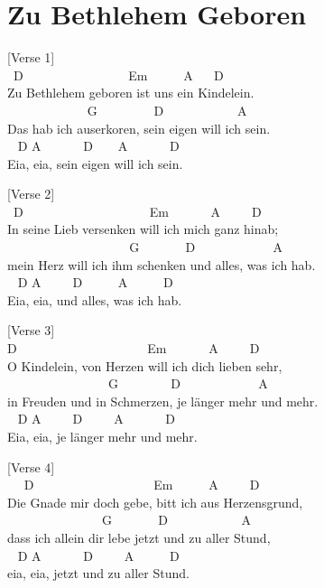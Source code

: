 \documentclass[
  letterpaper,
]{scrbook}
\begin{document}
\hypertarget{zu-bethlehem-geboren}{%
\chapter{Zu Bethlehem Geboren}\label{zu-bethlehem-geboren}}

{[}Verse 1{]}\\
\hspace*{0.333em} ~D ~ ~ ~ ~ ~ ~ ~ ~ ~ ~Em ~ ~ ~ A ~ ~D\\
Zu Bethlehem geboren ist uns ein Kindelein.\\
\hspace*{0.333em} ~ ~ ~ ~ ~ ~ ~ ~G ~ ~ ~ ~ ~ D ~ ~ ~ ~ ~ ~ ~A\\
Das hab ich auserkoren, sein eigen will ich sein.\\
\hspace*{0.333em} ~ D A ~ ~ ~ ~D ~ ~ A ~ ~ ~ ~D\\
Eia, eia, sein eigen will ich sein.

{[}Verse 2{]}\\
\hspace*{0.333em} ~D ~ ~ ~ ~ ~ ~ ~ ~ ~ ~ ~ ~Em ~ ~ ~ ~A ~ ~ ~D\\
In seine Lieb versenken will ich mich ganz hinab;\\
\hspace*{0.333em} ~ ~ ~ ~ ~ ~ ~ ~ ~ ~ ~ ~G ~ ~ ~ ~ D ~ ~ ~ ~ ~ ~ ~ A\\
mein Herz will ich ihm schenken und alles, was ich hab.\\
\hspace*{0.333em} ~ D A ~ ~ ~D ~ ~ ~ A ~ ~ ~ D\\
Eia, eia, und alles, was ich hab.

{[}Verse 3{]}\\
\hspace*{0.333em} D ~ ~ ~ ~ ~ ~ ~ ~ ~ ~ ~ ~ Em ~ ~ ~ ~A ~ ~ ~D\\
O Kindelein, von Herzen will ich dich lieben sehr,\\
\hspace*{0.333em} ~ ~ ~ ~ ~ ~ ~ ~ ~ ~G ~ ~ ~ ~ ~D ~ ~ ~ ~ ~ ~ ~ A\\
in Freuden und in Schmerzen, je länger mehr und mehr.\\
\hspace*{0.333em} ~ D A ~ ~ ~D ~ ~ ~A ~ ~ ~ ~D\\
Eia, eia, je länger mehr und mehr.

{[}Verse 4{]}\\
\hspace*{0.333em} ~ ~D ~ ~ ~ ~ ~ ~ ~ ~ ~ ~ ~ Em ~ ~ ~ A ~ ~ ~D\\
Die Gnade mir doch gebe, bitt ich aus Herzensgrund,\\
\hspace*{0.333em} ~ ~ ~ ~ ~ ~ ~ ~ ~ G ~ ~ ~ ~ D ~ ~ ~ ~ ~ ~ ~A\\
dass ich allein dir lebe jetzt und zu aller Stund,\\
\hspace*{0.333em} ~ D A ~ ~ ~ ~D ~ ~ ~A ~ ~ ~ D\\
eia, eia, jetzt und zu aller Stund.
\end{document}
